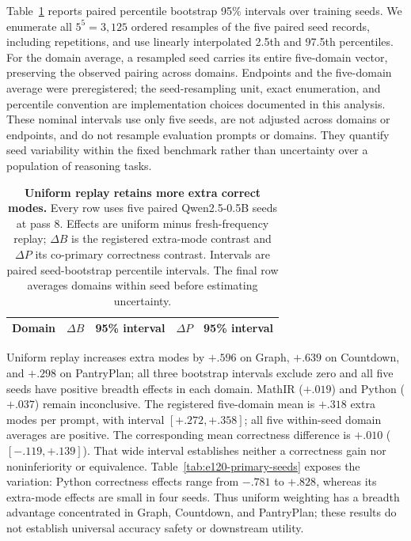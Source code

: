 Table~\ref{tab:e120-primary-breadth} reports paired percentile bootstrap
95\% intervals over training seeds. We enumerate all $5^5=3{,}125$ ordered
resamples of the five paired seed records, including repetitions, and use
linearly interpolated 2.5th and 97.5th percentiles. For the domain average,
a resampled seed carries its entire five-domain vector, preserving the
observed pairing across domains. Endpoints and the five-domain average were
preregistered; the seed-resampling unit, exact enumeration, and percentile
convention are implementation choices documented in this analysis. These
nominal intervals use only five seeds, are not adjusted across domains or
endpoints, and do not resample evaluation prompts or domains. They quantify
seed variability within the fixed benchmark rather than uncertainty over a
population of reasoning tasks.

\begin{table}[H]
  \centering
  \caption{\textbf{Uniform replay retains more extra correct modes.}
  Every row uses five paired Qwen2.5-0.5B seeds at pass 8. Effects are
  uniform minus fresh-frequency replay; $\Delta B$ is the registered
  extra-mode contrast and $\Delta P$ its co-primary correctness contrast.
  Intervals are paired seed-bootstrap percentile intervals. The final row
  averages domains within seed before estimating uncertainty.}
  \label{tab:e120-primary-breadth}
  \small
  \setlength{\tabcolsep}{4pt}
  \begin{tabular}{@{}lrrrr@{}}
    \toprule
    \textbf{Domain} & $\Delta B$ & \textbf{95\% interval}
      & $\Delta P$ & \textbf{95\% interval} \\
    \midrule
    
  \end{tabular}
\end{table}

Uniform replay increases extra modes by $+.596$ on Graph, $+.639$ on
Countdown, and $+.298$ on PantryPlan; all three bootstrap intervals exclude
zero and all five seeds have positive breadth effects in each domain.
MathIR ($+.019$) and Python ($+.037$) remain inconclusive. The registered
five-domain mean is $+.318$ extra modes per prompt, with interval
$[+.272,+.358]$; all five within-seed domain averages are positive.
The corresponding mean correctness difference is $+.010$
($[-.119,+.139]$). That wide interval establishes neither a correctness gain
nor noninferiority or equivalence. Table~\ref{tab:e120-primary-seeds} exposes
the variation: Python correctness effects range from $-.781$ to $+.828$,
whereas its extra-mode effects are small in four seeds. Thus uniform weighting
has a breadth advantage concentrated in Graph, Countdown, and PantryPlan;
these results do not establish universal accuracy safety or downstream utility.

